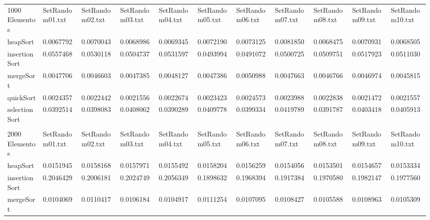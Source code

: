 \documentclass[article,a4paper]{article}
\begin{document}
\begin{table}[h]
{\begin{tabular}{lllllllllll}
1000 Elementos  & SetRandom01.txt & SetRandom02.txt & SetRandom03.txt & SetRandom04.txt & SetRandom05.txt & SetRandom06.txt & SetRandom07.txt & SetRandom08.txt & SetRandom09.txt & SetRandom10.txt \\
heapSort        & 0.0067792       & 0.0070043       & 0.0068986       & 0.0069345       & 0.0072190       & 0.0073125       & 0.0081850       & 0.0068475       & 0.0070931       & 0.0068505       \\
insertionSort   & 0.0557468       & 0.0530118       & 0.0504737       & 0.0531597       & 0.0493994       & 0.0491072       & 0.0500725       & 0.0509751       & 0.0517923       & 0.0511030       \\
mergeSort       & 0.0047706       & 0.0046603       & 0.0047385       & 0.0048127       & 0.0047386       & 0.0050988       & 0.0047663       & 0.0046766       & 0.0046974       & 0.0045815       \\
quickSort       & 0.0024357       & 0.0022442       & 0.0021556       & 0.0022674       & 0.0023423       & 0.0024573       & 0.0023988       & 0.0022838       & 0.0021472       & 0.0021557       \\
selectionSort   & 0.0392514       & 0.0398083       & 0.0408062       & 0.0390289       & 0.0409778       & 0.0399334       & 0.0419789       & 0.0391787       & 0.0403418       & 0.0405913       \\
                &                 &                 &                 &                 &                 &                 &                 &                 &                 &                 \\
2000 Elementos  & SetRandom01.txt & SetRandom02.txt & SetRandom03.txt & SetRandom04.txt & SetRandom05.txt & SetRandom06.txt & SetRandom07.txt & SetRandom08.txt & SetRandom09.txt & SetRandom10.txt \\
heapSort        & 0.0151945       & 0.0158168       & 0.0157971       & 0.0155492       & 0.0158204       & 0.0156259       & 0.0154056       & 0.0153501       & 0.0154657       & 0.0153334       \\
insertionSort   & 0.2046429       & 0.2006181       & 0.2024749       & 0.2056349       & 0.1898632       & 0.1968394       & 0.1917384       & 0.1970580       & 0.1982147       & 0.1977560       \\
mergeSort       & 0.0104069       & 0.0110417       & 0.0106184       & 0.0104917       & 0.0111254       & 0.0107095       & 0.0108427       & 0.0105588       & 0.0108963       & 0.0105309       \\

\end{tabular}}
\end{table}
\end{document}
